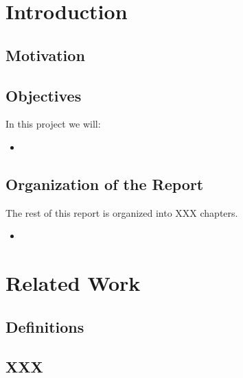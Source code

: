 \documentclass[11pt]{report}
\begin{document}
\chapter{Introduction}


\section{Motivation}

\section{Objectives}

In this project we will:

\begin{itemize}
\item 
\end{itemize}

\section{Organization of the Report}
The rest of this report is organized into XXX chapters.

\begin{itemize}
\item 
\end{itemize}

\chapter{Related Work}

\section{Definitions}



\section{XXX}
\end{document}
